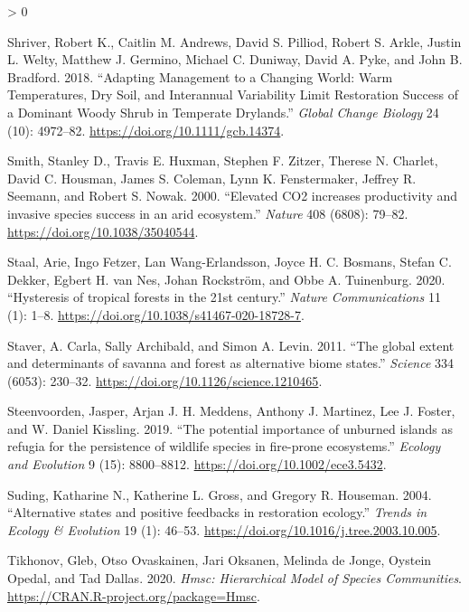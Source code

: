 \documentclass[
  12pt,
]{article}
\newlength{\cslhangindent}
\newenvironment{CSLReferences}[2] %
 {%
  \setlength{\parindent}{0pt}
  \ifodd #1 \everypar{\setlength{\hangindent}{\cslhangindent}}\ignorespaces\fi
  \ifnum #2 > 0
  \setlength{\parskip}{#2\baselineskip}
  \fi
 }%
 {}
\begin{document}
\begin{CSLReferences}{1}{0}
\leavevmode\hypertarget{ref-Shriver2018}{}%
Shriver, Robert K., Caitlin M. Andrews, David S. Pilliod, Robert S.
Arkle, Justin L. Welty, Matthew J. Germino, Michael C. Duniway, David A.
Pyke, and John B. Bradford. 2018. {``Adapting Management to a Changing
World: {Warm} Temperatures, Dry Soil, and Interannual Variability Limit
Restoration Success of a Dominant Woody Shrub in Temperate Drylands.''}
\emph{Global Change Biology} 24 (10): 4972--82.
\url{https://doi.org/10.1111/gcb.14374}.

\leavevmode\hypertarget{ref-Smith2000}{}%
Smith, Stanley D., Travis E. Huxman, Stephen F. Zitzer, Therese N.
Charlet, David C. Housman, James S. Coleman, Lynn K. Fenstermaker,
Jeffrey R. Seemann, and Robert S. Nowak. 2000. {``{Elevated CO2
increases productivity and invasive species success in an arid
ecosystem}.''} \emph{Nature} 408 (6808): 79--82.
\url{https://doi.org/10.1038/35040544}.

\leavevmode\hypertarget{ref-Staal2020}{}%
Staal, Arie, Ingo Fetzer, Lan Wang-Erlandsson, Joyce H. C. Bosmans,
Stefan C. Dekker, Egbert H. van Nes, Johan Rockström, and Obbe A.
Tuinenburg. 2020. {``{Hysteresis of tropical forests in the 21st
century}.''} \emph{Nature Communications} 11 (1): 1--8.
\url{https://doi.org/10.1038/s41467-020-18728-7}.

\leavevmode\hypertarget{ref-Staver2011}{}%
Staver, A. Carla, Sally Archibald, and Simon A. Levin. 2011. {``{The
global extent and determinants of savanna and forest as alternative
biome states}.''} \emph{Science} 334 (6053): 230--32.
\url{https://doi.org/10.1126/science.1210465}.

\leavevmode\hypertarget{ref-Steenvoorden2019}{}%
Steenvoorden, Jasper, Arjan J. H. Meddens, Anthony J. Martinez, Lee J.
Foster, and W. Daniel Kissling. 2019. {``{The potential importance of
unburned islands as refugia for the persistence of wildlife species in
fire-prone ecosystems}.''} \emph{Ecology and Evolution} 9 (15):
8800--8812. \url{https://doi.org/10.1002/ece3.5432}.

\leavevmode\hypertarget{ref-Suding2004}{}%
Suding, Katharine N., Katherine L. Gross, and Gregory R. Houseman. 2004.
{``{Alternative states and positive feedbacks in restoration
ecology}.''} \emph{Trends in Ecology \& Evolution} 19 (1): 46--53.
\url{https://doi.org/10.1016/j.tree.2003.10.005}.

\leavevmode\hypertarget{ref-HMSC}{}%
Tikhonov, Gleb, Otso Ovaskainen, Jari Oksanen, Melinda de Jonge, Oystein
Opedal, and Tad Dallas. 2020. \emph{Hmsc: Hierarchical Model of Species
Communities}. \url{https://CRAN.R-project.org/package=Hmsc}.


\end{CSLReferences}
\end{document}
